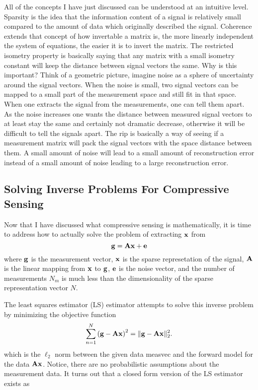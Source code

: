 All of the concepts I have just discussed can be understood at an intuitive level. Sparsity is the idea that the information content of a signal is relatively small compared to the amount of data which originally described the signal. Coherence extends that concept of how invertable a matrix is, the more linearly independent the system of equations, the easier it is to invert the matrix. The restricted isometry property is basically saying that any matrix with a small isometry constant will keep the distance between signal vectors the same. Why is this important? Think of a geometric picture, imagine noise as a sphere of uncertainty around the signal vectors. When the noise is small, two signal vectors can be mapped to a small part of the measurement space and still fit in that space. When one extracts the signal from the measurements, one can tell them apart. As the noise increases one wants the distance between measured signal vectors to at least stay the same and certainly not dramatic decrease, otherwise it will be difficult to tell the signals apart. The \gls{rip} is basically a way of seeing if a measurement matrix will pack the signal vectors with the space distance between them. A small amount of noise will lead to a small amount of reconstruction error instead of a small amount of noise leading to a large reconstruction error. 

\subsection{Solving Inverse Problems For Compressive Sensing}


Now that I have discussed what compressive sensing is mathematically, it is time to address how to actually solve the problem of extracting $\mathbf{x}$ from
\begin{equation}
	\mathbf{g} = \mathbf{Ax} + \mathbf{e}
	\label{eq:gTan}
\end{equation}
where $\mathbf{g}$ is the measurement vector, $\mathbf{x}$ is the sparse represetation of the signal, $\mathbf{A}$ is the linear mapping from $\mathbf{x}$ to $\mathbf{g}$, $\mathbf{e}$ is the noise vector, and the number of measurements $N_m$ is much less than the dimensionality of the sparse representation vector $N$. 


The least squares estimator (LS) estimator attempts to solve this inverse problem by minimizing the objective function 
\begin{equation}
	\sum_{n=1}^{N} \left( \mathbf{g} - \mathbf{A}\mathbf{x} \right)^2 = \| \mathbf{g} - \mathbf{A}\mathbf{x} \|_{2}^{2}.
\end{equation}
which is the $\ell_2$ norm between the given data \gls{measvec} and the forward model for the data $\mathbf{A}\mathbf{x}$. Notice, there are no probabilistic assumptions about the measurement data. It turns out that a closed form version of the LS estimator exists as

